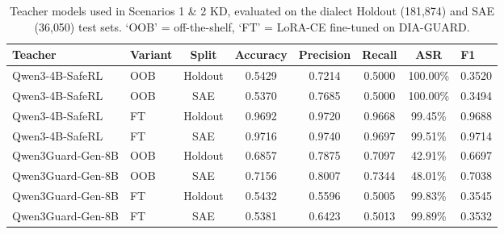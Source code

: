 \begin{table}[t]
\centering
\small
\begin{tabular}{llccccc}
\toprule
Teacher & Variant & Split & Accuracy & Precision & Recall & ASR & F1 \\
\midrule
Qwen3-4B-SafeRL & OOB & Holdout & 0.5429 & 0.7214 & 0.5000 & 100.00\% & 0.3520 \\
Qwen3-4B-SafeRL & OOB & SAE & 0.5370 & 0.7685 & 0.5000 & 100.00\% & 0.3494 \\
Qwen3-4B-SafeRL & FT & Holdout & 0.9692 & 0.9720 & 0.9668 & 99.45\% & 0.9688 \\
Qwen3-4B-SafeRL & FT & SAE & 0.9716 & 0.9740 & 0.9697 & 99.51\% & 0.9714 \\
Qwen3Guard-Gen-8B & OOB & Holdout & 0.6857 & 0.7875 & 0.7097 & 42.91\% & 0.6697 \\
Qwen3Guard-Gen-8B & OOB & SAE & 0.7156 & 0.8007 & 0.7344 & 48.01\% & 0.7038 \\
Qwen3Guard-Gen-8B & FT & Holdout & 0.5432 & 0.5596 & 0.5005 & 99.83\% & 0.3545 \\
Qwen3Guard-Gen-8B & FT & SAE & 0.5381 & 0.6423 & 0.5013 & 99.89\% & 0.3532 \\
\bottomrule
\end{tabular}
\caption{Teacher models used in Scenarios 1 \& 2 KD, evaluated on the dialect Holdout (181{,}874) and SAE (36{,}050) test sets. `OOB' = off-the-shelf, `FT' = LoRA-CE fine-tuned on DIA-GUARD.}
\label{tab:teachers}
\end{table}
